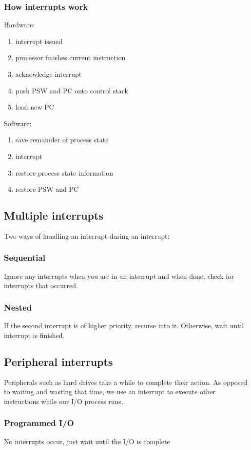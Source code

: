 \documentclass[]{article}
\theoremstyle{definition}
\begin{document}
			\subsubsection{How interrupts work}
				Hardware:				
				\begin{enumerate}
					\item interrupt issued
					\item processor finishes current instruction
					\item acknowledge interrupt
					\item push PSW and PC onto control stack
					\item load new PC
				\end{enumerate}
				Software:
				\begin{enumerate}[resume]									
					\item save remainder of process state
					\item interrupt
					\item restore process state information
					\item restore PSW and PC
				\end{enumerate}
			\subsection{Multiple interrupts}
				Two ways of handling an interrupt during an interrupt:
				\subsubsection{Sequential}
					Ignore any interrupts when you are in an interrupt and when done, check for interrupts that occurred.
				\subsubsection{Nested}
					If the second interrupt is of higher priority, recurse into it. Otherwise, wait until interrupt is finished.
		\subsection{Peripheral interrupts}
			Peripherals such as hard drives take a while to complete their action. As opposed to waiting and wasting that time, we use an interrupt to execute other instructions while our I/O process runs.
			\subsubsection{Programmed I/O}
				No interrupts occur, just wait until the I/O is complete
\end{document}
